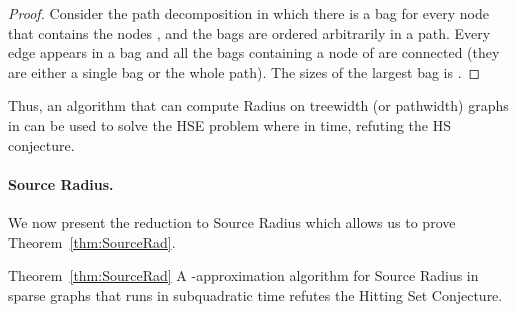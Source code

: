 \begin{proof}
Consider the path decomposition  in which there is a bag  for every node  that contains the nodes , and the bags are ordered arbitrarily in a path.
Every edge appears in a bag and all the bags containing a node of  are connected (they are either a single bag or the whole path).
The sizes of the largest bag is .
\end{proof}

Thus, an algorithm that can compute Radius on treewidth (or pathwidth)  graphs in  can be used to solve the HSE problem where  in  time, refuting the HS conjecture.


\paragraph{Source Radius.} We now present the reduction to Source Radius which allows us to prove Theorem~\ref{thm:SourceRad}.

\begin{reminder}{Theorem~\ref{thm:SourceRad}}
A -approximation algorithm for Source Radius in sparse graphs that runs in subquadratic time refutes the Hitting Set Conjecture.
\end{reminder}

